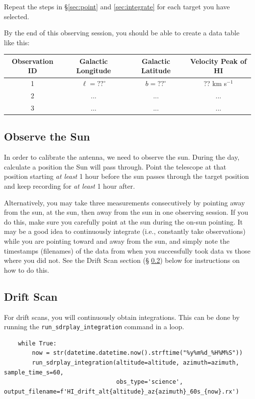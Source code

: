 \documentclass[11pt]{article}
\begin{document}
Repeat the steps in \S \ref{sec:point} and \ref{sec:integrate} for each target you have selected.

By the end of this observing session, you should be able to create a data table like this:

\begin{tabular}{|c|c|c|c|}
\hline
 Observation ID &   Galactic Longitude & Galactic Latitude & Velocity Peak of HI \\
\hline
 1  & $\ell= ?? ^\circ$ & $b= ?? ^\circ$ & ?? km s$^{-1}$ \\
 \hline
 2  & ... & ... & ... \\
 \hline
 3  & ... & ... & ... \\
 \hline
\end{tabular}

\subsection{Observe the Sun}
In order to calibrate the antenna, we need to observe the sun.  During the day,
calculate a position the Sun will pass through.  Point the telescope at that
position starting \emph{at least} 1 hour before the sun passes through the
target position and keep recording for \emph{at least} 1 hour after.


Alternatively, you may take three measurements consecutively by pointing away
from the sun, at the sun, then away from the sun in one observing session.  If
you do this, make sure you carefully point at the sun during the on-sun
pointing.  It may be a good idea to continuously integrate (i.e., constantly
take observations) while you are pointing toward and away from the sun, and
simply note the timestamps (filenames) of the data from when you successfully
took data vs those where you did not.  See the Drift Scan section (\S
\ref{sec:driftscan}) below for instructions on how to do this.

\subsection{Drift Scan}
\label{sec:driftscan}

For drift scans, you will continuously obtain integrations.
This can be done by running the \verb|run_sdrplay_integration| command in a loop.

\begin{verbatim}
    while True:
        now = str(datetime.datetime.now().strftime("%y%m%d_%H%M%S"))
        run_sdrplay_integration(altitude=altitude, azimuth=azimuth, sample_time_s=60,
                                obs_type='science', output_filename=f'HI_drift_alt{altitude}_az{azimuth}_60s_{now}.rx')
\end{verbatim}
\end{document}
